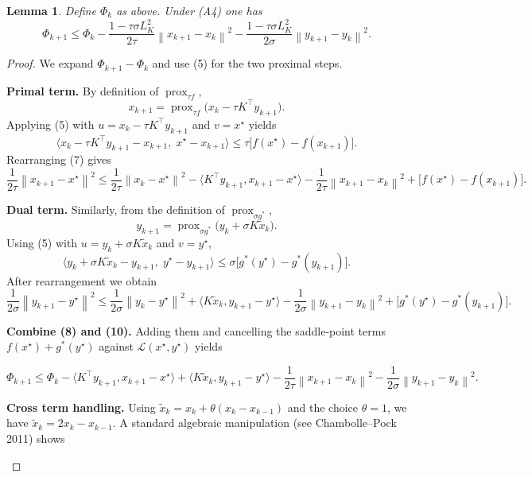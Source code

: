 \documentclass{article}
\newtheorem{lemma}{Lemma}
\newcommand{\norm}[1]{\left\lVert#1\right\rVert}
\begin{document}
\begin{lemma}\label{lem:descent}
Define $\Phi_{k}$ as above. Under (A4) one has  
\[
\Phi_{k+1}\le \Phi_{k}
            -\frac{1-\tau\sigma L_{K}^{2}}{2\tau}\norm{x_{k+1}-x_{k}}^{2}
            -\frac{1-\tau\sigma L_{K}^{2}}{2\sigma}\norm{y_{k+1}-y_{k}}^{2}.
\tag{6}
\]
\end{lemma}
\begin{proof}
We expand $\Phi_{k+1}-\Phi_{k}$ and use (5) for the two proximal steps.  
\begin{enumerate}[label={[\arabic*]}]
\item \textbf{Primal term.} By definition of $\operatorname{prox}_{\tau f}$,
\[
x_{k+1}= \operatorname{prox}_{\tau f}\!\bigl(x_{k}-\tau K^{\!\top}y_{k+1}\bigr).
\]
Applying (5) with $u=x_{k}-\tau K^{\!\top}y_{k+1}$ and $v=x^{\star}$ yields  
\[
\langle x_{k}-\tau K^{\!\top}y_{k+1}-x_{k+1},\;x^{\star}-x_{k+1}\rangle
\le \tau\bigl[f(x^{\star})-f(x_{k+1})\bigr]. \tag{7}
\]
Rearranging (7) gives  
\[
\frac{1}{2\tau}\norm{x_{k+1}-x^{\star}}^{2}
\le\frac{1}{2\tau}\norm{x_{k}-x^{\star}}^{2}
   -\langle K^{\!\top}y_{k+1},x_{k+1}-x^{\star}\rangle
   -\frac{1}{2\tau}\norm{x_{k+1}-x_{k}}^{2}
   +\bigl[f(x^{\star})-f(x_{k+1})\bigr]. \tag{8}
\]

\item \textbf{Dual term.} Similarly, from the definition of $\operatorname{prox}_{\sigma g^{*}}$,
\[
y_{k+1}= \operatorname{prox}_{\sigma g^{*}}\!\bigl(y_{k}+ \sigma K\tilde x_{k}\bigr).
\]
Using (5) with $u=y_{k}+ \sigma K\tilde x_{k}$ and $v=y^{\star}$,
\[
\langle y_{k}+ \sigma K\tilde x_{k}-y_{k+1},\;y^{\star}-y_{k+1}\rangle
\le \sigma\bigl[g^{*}(y^{\star})-g^{*}(y_{k+1})\bigr]. \tag{9}
\]
After rearrangement we obtain  
\[
\frac{1}{2\sigma}\norm{y_{k+1}-y^{\star}}^{2}
\le\frac{1}{2\sigma}\norm{y_{k}-y^{\star}}^{2}
   +\langle K\tilde x_{k},y_{k+1}-y^{\star}\rangle
   -\frac{1}{2\sigma}\norm{y_{k+1}-y_{k}}^{2}
   +\bigl[g^{*}(y^{\star})-g^{*}(y_{k+1})\bigr]. \tag{10}
\]

\item \textbf{Combine (8) and (10).} Adding them and cancelling the saddle‑point terms
$f(x^{\star})+g^{*}(y^{\star})$ against $\mathcal L(x^{\star},y^{\star})$ yields  

\[
\Phi_{k+1}
\le \Phi_{k}
   -\langle K^{\!\top}y_{k+1},x_{k+1}-x^{\star}\rangle
   +\langle K\tilde x_{k},y_{k+1}-y^{\star}\rangle
   -\frac{1}{2\tau}\norm{x_{k+1}-x_{k}}^{2}
   -\frac{1}{2\sigma}\norm{y_{k+1}-y_{k}}^{2}. \tag{11}
\]

\item \textbf{Cross term handling.} Using $\tilde x_{k}=x_{k}+\theta(x_{k}-x_{k-1})$ and the choice $\theta=1$, we have $\tilde x_{k}=2x_{k}-x_{k-1}$. A standard algebraic manipulation (see Chambolle–Pock 2011) shows  


\end{enumerate}
\end{proof}
\end{document}
